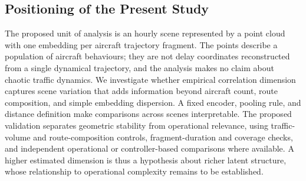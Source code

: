 \subsection{Positioning of the Present Study}
\label{sec:rw-positioning}
The proposed unit of analysis is an hourly scene represented by a point
cloud with one embedding per aircraft trajectory fragment. The points
describe a population of aircraft behaviours; they are not delay
coordinates reconstructed from a single dynamical trajectory, and the
analysis makes no claim about chaotic traffic dynamics. We investigate
whether empirical correlation dimension captures scene variation that
adds information beyond aircraft count, route composition, and simple
embedding dispersion. A fixed encoder, pooling rule, and distance
definition make comparisons across scenes interpretable. The proposed
validation separates geometric stability from operational relevance,
using traffic-volume and route-composition controls, fragment-duration
and coverage checks, and independent operational or controller-based
comparisons where available. A higher estimated dimension is thus a
hypothesis about richer latent structure, whose relationship to
operational complexity remains to be established.

